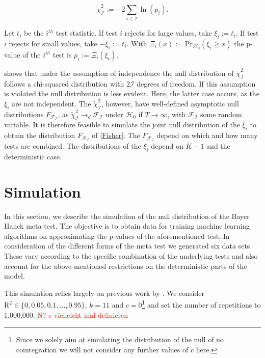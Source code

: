 \documentclass[12pt,a4paper]{article}
\let\rmarkdownfootnote\footnote%
\def\footnote{\protect\rmarkdownfootnote}
\begin{document}
\begin{equation}
\tilde{\chi}^2_{\mathcal{I}} := -2 \sum_{i \in \mathcal{I}} \ln{(p_i)}. 
\label{Fisher}
\end{equation}

Let \(t_i\) be the \(i^{th}\) test statistic. If test \(i\) rejects for
large values, take \(\xi_i := t_i\). If test \(i\) rejects for small
values, take \(-\xi_i := t_i\). With
\(\Xi_i(x) := \text{Pr}_{\mathcal{H_0}}(\xi_i \geq x)\) the p-value of
the \(i^{th}\) test is \(p_i := \Xi_i(\xi_i)\).

\textcite{Fisher_1932} shows that under the assumption of independence
the null distribution of \(\tilde{\chi}^2_{\mathcal{I}}\) follows a
chi-squared distribution with \(2\mathcal{I}\) degrees of freedom. If
this assumption is violated the null distribution is less evident. Here,
the latter case occurs, as the \(\xi_i\) are not independent. The
\(\tilde{\chi}^2_{\mathcal{I}}\), however, have well-defined asymptotic
null distributions \(F_{\mathcal{F_I}}\), as
\(\tilde{\chi}^2_{\mathcal{I}} \rightarrow_d \mathcal{F_I}\) under
\(\mathcal{H}_0\) if \(T \rightarrow \infty\), with \(\mathcal{F_I}\)
some random variable. It is therefore feasible to simulate the joint
null distribution of the \(\xi_i\) to obtain the distribution
\(F_{\mathcal{F_I}}\) of \ref{Fisher}. The \(F_{\mathcal{F_I}}\) depend
on which and how many tests are combined. The distributions of the
\(\xi_i\) depend on \(K-1\) and the deterministic case.

\hypertarget{simulation}{%
\section{Simulation}\label{simulation}}

In this section, we describe the simulation of the null distribution of
the Bayer Hanck meta test. The objective is to obtain data for training
machine learning algorithms on approximating the p-values of the
aforementioned test. In consideration of the different forms of the meta
test we generated six data sets. These vary according to the specific
combination of the underlying tests and also account for the
above-mentioned restrictions on the deterministic parts of the model.

This simulation relies largely on previous work by
\textcite{Pesavento_2004}. We consider
\(\text{R}^2 \in \{0, 0.05, 0.1, ..., 0.95\}\), \(k = 11\) and
\(c = 0\)\footnote{Since we solely aim at simulating the distribution of
  the null of no cointegration we will not consider any further values
  of \(c\) here.} and set the number of repetitions to 1,000,000.
\textcolor{red}{N? c vielleicht mal definieren}
\end{document}
